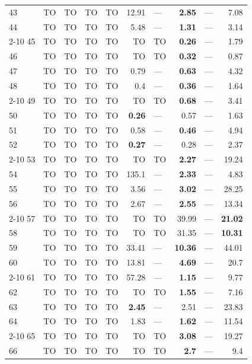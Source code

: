 \begin{longtable}{lr@{\hskip 4pt}l@{\hskip 12pt}r@{\hskip 4pt}l@{\hskip 12pt}r@{\hskip 4pt}l@{\hskip 12pt}r@{\hskip 4pt}l@{\hskip 12pt}r}
43 & TO & TO & TO & TO & 12.91 & --- & \textbf{2.85} & --- & 7.08 \\
44 & TO & TO & TO & TO & 5.48 & --- & \textbf{1.31} & --- & 3.14 \\
\cmidrule{2-10}
45 & TO & TO & TO & TO & TO & TO & \textbf{0.26} & --- & 1.79 \\
46 & TO & TO & TO & TO & TO & TO & \textbf{0.32} & --- & 0.87 \\
47 & TO & TO & TO & TO & 0.79 & --- & \textbf{0.63} & --- & 4.32 \\
48 & TO & TO & TO & TO & 0.4 & --- & \textbf{0.36} & --- & 1.64 \\
\cmidrule{2-10}
49 & TO & TO & TO & TO & TO & TO & \textbf{0.68} & --- & 3.41 \\
50 & TO & TO & TO & TO & \textbf{0.26} & --- & 0.57 & --- & 1.63 \\
51 & TO & TO & TO & TO & 0.58 & --- & \textbf{0.46} & --- & 4.94 \\
52 & TO & TO & TO & TO & \textbf{0.27} & --- & 0.28 & --- & 2.37 \\
\cmidrule{2-10}
53 & TO & TO & TO & TO & TO & TO & \textbf{2.27} & --- & 19.24 \\
54 & TO & TO & TO & TO & 135.1 & --- & \textbf{2.33} & --- & 4.83 \\
55 & TO & TO & TO & TO & 3.56 & --- & \textbf{3.02} & --- & 28.25 \\
56 & TO & TO & TO & TO & 2.67 & --- & \textbf{2.55} & --- & 13.34 \\
\cmidrule{2-10}
57 & TO & TO & TO & TO & TO & TO & 39.99 & --- & \textbf{21.02} \\
58 & TO & TO & TO & TO & TO & TO & 31.35 & --- & \textbf{10.31} \\
59 & TO & TO & TO & TO & 33.41 & --- & \textbf{10.36} & --- & 44.01 \\
60 & TO & TO & TO & TO & 13.81 & --- & \textbf{4.69} & --- & 20.7 \\
\cmidrule{2-10}
61 & TO & TO & TO & TO & 57.28 & --- & \textbf{1.15} & --- & 9.77 \\
62 & TO & TO & TO & TO & TO & TO & \textbf{1.55} & --- & 7.16 \\
63 & TO & TO & TO & TO & \textbf{2.45} & --- & 2.51 & --- & 23.83 \\
64 & TO & TO & TO & TO & 1.83 & --- & \textbf{1.62} & --- & 11.54 \\
\cmidrule{2-10}
65 & TO & TO & TO & TO & TO & TO & \textbf{3.08} & --- & 19.27 \\
66 & TO & TO & TO & TO & TO & TO & \textbf{2.7} & --- & 9.4 \\

\end{longtable}
